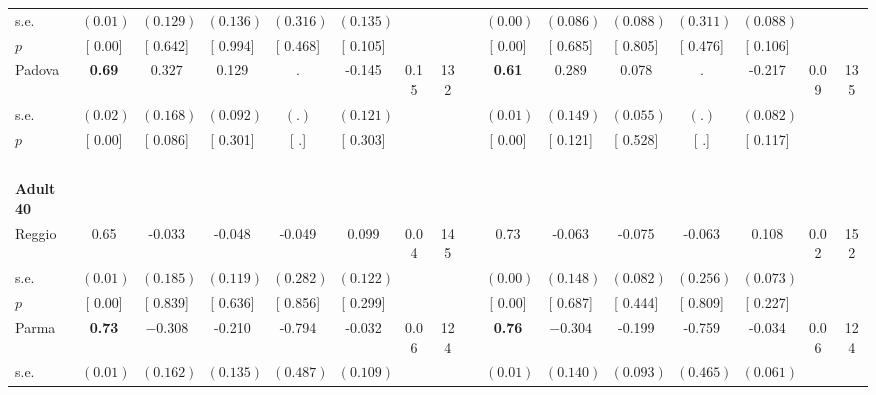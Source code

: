 \begin{longtable}{L{8em} c c c c c c c p{1em} c c c c c c c}
\quad \quad \quad \quad s.e.& $ (     0.01)$ & $ (    0.129)$ & $ (    0.136)$ & $ (    0.316)$ & $ (    0.135)$ & & & & $ (     0.00)$ & $ (    0.086)$ & $ (    0.088)$ & $ (    0.311)$ & $ (    0.088)$ & &  \\*
\quad \quad \quad \quad $ p$ & [     0.00] & [    0.642] & [    0.994] & [    0.468] & [    0.105] & & & & [     0.00] & [    0.685] & [    0.805] & [    0.476] & [    0.106] & &  \\[1em]
\quad \quad \quad Padova& \textbf{     0.69} & $ \mathbf{    0.327}$ &     0.129 &         . &    -0.145 &      0.15 &       132 & & \textbf{     0.61} &     0.289 &     0.078 &         . &    -0.217 &      0.09 &       135  \\*
\quad \quad \quad \quad s.e.& $ (     0.02)$ & $ (    0.168)$ & $ (    0.092)$ & $ (        .)$ & $ (    0.121)$ & & & & $ (     0.01)$ & $ (    0.149)$ & $ (    0.055)$ & $ (        .)$ & $ (    0.082)$ & &  \\*
\quad \quad \quad \quad $ p$ & [     0.00] & [    0.086] & [    0.301] & [        .] & [    0.303] & & & & [     0.00] & [    0.121] & [    0.528] & [        .] & [    0.117] & &  \\[1em]
~\\[1em]
\quad \quad \textbf{Adult 40} & & & & & & & & & & & & & & & \\* 
\quad \quad \quad Reggio& 0.65 &    -0.033 &    -0.048 &    -0.049 &     0.099 &      0.04 &       145 & & 0.73 &    -0.063 &    -0.075 &    -0.063 &     0.108 &      0.02 &       152  \\*
\quad \quad \quad \quad s.e.& $ (     0.01)$ & $ (    0.185)$ & $ (    0.119)$ & $ (    0.282)$ & $ (    0.122)$ & & & & $ (     0.00)$ & $ (    0.148)$ & $ (    0.082)$ & $ (    0.256)$ & $ (    0.073)$ & &  \\*
\quad \quad \quad \quad $ p$ & [     0.00] & [    0.839] & [    0.636] & [    0.856] & [    0.299] & & & & [     0.00] & [    0.687] & [    0.444] & [    0.809] & [    0.227] & &  \\[1em]
\quad \quad \quad Parma& \textbf{     0.73} & $ \mathbf{   -0.308}$ &    -0.210 &    -0.794 &    -0.032 &      0.06 &       124 & & \textbf{     0.76} & $ \mathbf{   -0.304}$ &    -0.199 &    -0.759 &    -0.034 &      0.06 &       124  \\*
\quad \quad \quad \quad s.e.& $ (     0.01)$ & $ (    0.162)$ & $ (    0.135)$ & $ (    0.487)$ & $ (    0.109)$ & & & & $ (     0.01)$ & $ (    0.140)$ & $ (    0.093)$ & $ (    0.465)$ & $ (    0.061)$ & &  \\*

\end{longtable}
